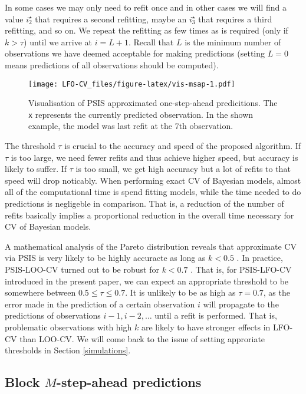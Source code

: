\documentclass[american,]{article}
\begin{document}
In some cases we may only need to refit once and in other cases we will find a
value \(i^\star_2\) that requires a second refitting, maybe an \(i^\star_3\) that
requires a third refitting, and so on. We repeat the refitting as few times as
is required (only if \(k > \tau\)) until we arrive at \(i = L + 1\). Recall that \(L\)
is the minimum number of observations we have deemed acceptable for making
predictions (setting \(L=0\) means predictions of all observations should be
computed).

\begin{figure}
\centering
\texttt{[image: LFO-CV\_files/figure-latex/vis-msap-1.pdf]}
\caption{\label{fig:vis-msap}Visualisation of PSIS approximated one-step-ahead predicitions. The \texttt{x} represents the currently predicted observation. In the shown example, the model was last refit at the 7th observation.}
\end{figure}

The threshold \(\tau\) is crucial to the accuracy and speed of the proposed
algorithm. If \(\tau\) is too large, we need fewer refits and thus achieve higher
speed, but accuracy is likely to suffer. If \(\tau\) is too small, we get high
accuracy but a lot of refits to that speed will drop noticably. When performing
exact CV of Bayesian models, almost all of the computational time is spend
fitting models, while the time needed to do predictions is negligeble in
comparison. That is, a reduction of the number of refits basically implies a
proportional reduction in the overall time necessary for CV of Bayesian models.

A mathematical analysis of the Pareto distribution reveals that approximate CV
via PSIS is very likely to be highly accuracte as long as \(k < 0.5\)
\citep{vehtari2017psis}. In practice, PSIS-LOO-CV turned out to be robust for
\(k < 0.7\) \citep{vehtari2017loo}. That is, for PSIS-LFO-CV introduced in the
present paper, we can expect an appropriate threshold to be somewhere between
\(0.5 \leq \tau \leq 0.7\). It is unlikely to be as high as \(\tau = 0.7\), as the
error made in the prediction of a certain observation \(i\) will propagate to the
predictions of observations \(i-1, i-2, \ldots\) until a refit is performed. That
is, problematic observations with high \(k\) are likely to have stronger effects
in LFO-CV than LOO-CV. We will come back to the issue of setting approriate
thresholds in Section \ref{simulations}.

\hypertarget{approximate_blockMSAP}{%
\subsection{\texorpdfstring{Block \(M\)-step-ahead predictions}{Block M-step-ahead predictions}}\label{approximate_blockMSAP}}
\end{document}
